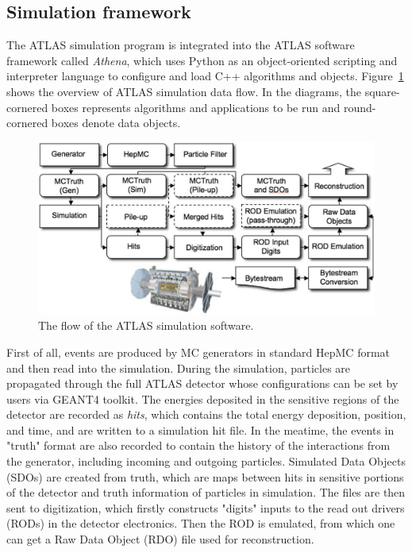 \subsection{Simulation framework}

The ATLAS simulation program is integrated into the ATLAS software framework called \textit{Athena}\cite{atlas:athena},
which uses Python as an object-oriented scripting and interpreter language to configure and load C++ algorithms and objects.
Figure~\ref{fig:frame_overview} shows the overview of ATLAS simulation data flow\cite{Aad:2010ah}.
In the diagrams, the square-cornered boxes represents algorithms and applications to be run and round-cornered boxes denote data objects.
\begin{figure}[!htb]
  \centering
  \includegraphics[width=1.0\textwidth]{figures/Simulation/outline_atalsSimulation_v2.png}
  \caption{The flow of the ATLAS simulation software.}
  \label{fig:frame_overview}
\end{figure}

First of all, events are produced by MC generators in standard HepMC format and then read into the simulation.
During the simulation, particles are propagated through the full ATLAS detector whose configurations can be set by users via GEANT4 toolkit.
The energies deposited in the sensitive regions of the detector are recorded as \textit{hits}, which contains the total energy deposition,
position, and time, and are written to a simulation hit file.
In the meatime, the events in "truth" format are also recorded to contain the history of the interactions from the generator, including incoming and outgoing particles.
Simulated Data Objects (SDOs) are created from truth, which are maps between hits in sensitive portions of the detector and truth information of particles in simulation.
The files are then sent to digitization, which firstly constructs "digits" inputs to the read out drivers (RODs) in the detector electronics.
Then the ROD is emulated, from which one can get a Raw Data Object (RDO) file used for reconstruction.

